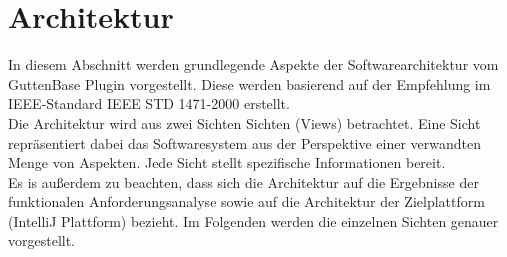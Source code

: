 




\section{Architektur}
In diesem Abschnitt werden grundlegende Aspekte der Softwarearchitektur vom GuttenBase Plugin vorgestellt. Diese werden basierend auf der Empfehlung im IEEE-Standard IEEE STD 1471-2000 erstellt.\\
Die Architektur wird aus zwei Sichten Sichten (Views) betrachtet. Eine Sicht repräsentiert dabei das Softwaresystem aus der Perspektive einer verwandten Menge von Aspekten. Jede Sicht stellt spezifische Informationen bereit.\\
Es is außerdem zu beachten, dass sich die Architektur auf die Ergebnisse der funktionalen Anforderungsanalyse sowie auf die Architektur der Zielplattform (IntelliJ Plattform) bezieht.
Im Folgenden werden die einzelnen Sichten genauer vorgestellt.




